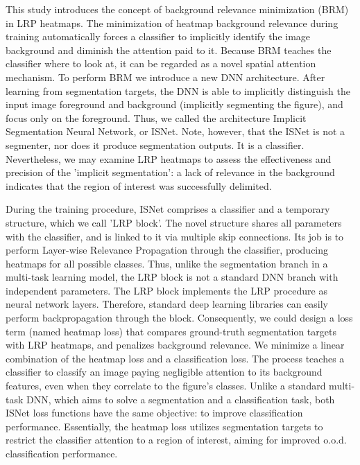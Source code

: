 \documentclass[fleqn,10pt]{wlscirep}
\begin{document}
This study introduces the concept of background relevance minimization (BRM) in LRP heatmaps. The minimization of heatmap background relevance during training automatically forces a classifier to implicitly identify the image background and diminish the attention paid to it. Because BRM teaches the classifier where to look at, it can be regarded as a novel spatial attention mechanism. To perform BRM we introduce a new DNN architecture. After learning from segmentation targets, the DNN is able to implicitly distinguish the input image foreground and background (implicitly segmenting the figure), and focus only on the foreground. Thus, we called the architecture Implicit Segmentation Neural Network, or ISNet. Note, however, that the ISNet is not a segmenter, nor does it produce segmentation outputs. It is a classifier. Nevertheless, we may examine LRP heatmaps to assess the effectiveness and precision of the 'implicit segmentation': a lack of relevance in the background indicates that the region of interest was successfully delimited.

During the training procedure, ISNet comprises a classifier and a temporary structure, which we call 'LRP block'. The novel structure shares all parameters with the classifier, and is linked to it via multiple skip connections. Its job is to perform Layer-wise Relevance Propagation through the classifier, producing heatmaps for all possible classes. Thus, unlike the segmentation branch in a multi-task learning model, the LRP block is not a standard DNN branch with independent parameters. The LRP block implements the LRP procedure as neural network layers. Therefore, standard deep learning libraries can easily perform backpropagation through the block. Consequently, we could design a loss term (named heatmap loss) that compares ground-truth segmentation targets with LRP heatmaps, and penalizes background relevance. We minimize a linear combination of the heatmap loss and a classification loss. The process teaches a classifier to classify an image paying negligible attention to its background features, even when they correlate to the figure's classes. Unlike a standard multi-task DNN, which aims to solve a segmentation and a classification task, both ISNet loss functions have the same objective: to improve classification performance. Essentially, the heatmap loss utilizes segmentation targets to restrict the classifier attention to a region of interest, aiming for improved o.o.d. classification performance.
\end{document}
